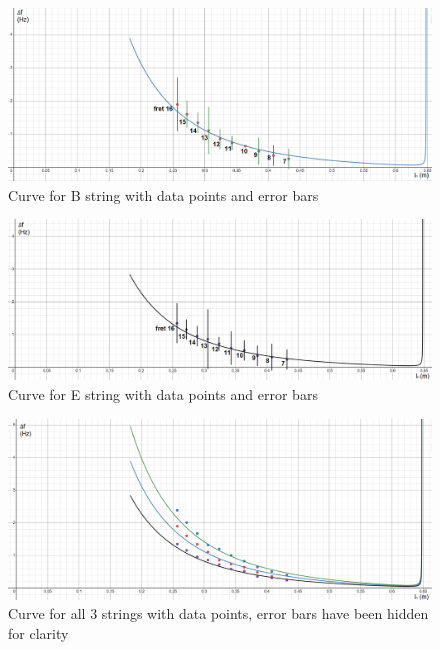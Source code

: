 \begin{figure}[!htb]
    \includegraphics[width = \textwidth]{ee/compare b string.png}
    \caption{Curve for B string with data points and error bars} \label{fig10}
\end{figure}
\begin{figure}[!htb]
    \includegraphics[width = \textwidth]{ee/compare e string.png}
    \caption{Curve for E string with data points and error bars} \label{fig11}
\end{figure}
\begin{figure}[!htb]
    \includegraphics[width = \textwidth]{ee/all 3.png}
    \caption{Curve for all 3 strings with data points, error bars have been hidden for clarity} \label{fig12}
\end{figure}
